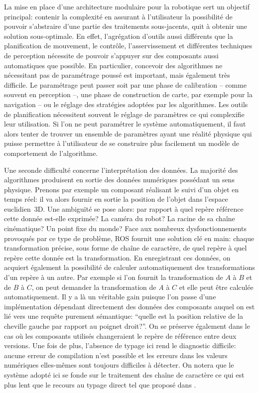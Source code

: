 La mise en place d'une architecture modulaire pour la robotique sert
un objectif principal: contenir la complexité en assurant à
l'utilisateur la possibilité de pouvoir s'abstraire d'une partie des
traitements sous-jacents, quit à obtenir une solution
sous-optimale. En effet, l'agrégation d'outils aussi différents que la
planification de mouvement, le contrôle, l'asservissement et
différentes techniques de perception nécessite de pouvoir s'appuyer
sur des composants aussi automatiques que possible. En particulier,
concevoir des algorithmes ne nécessitant pas de paramétrage poussé est
important, mais également très difficile. Le paramétrage peut passer
soit par une phase de calibration -- comme souvent en perception --,
une phase de construction de carte, par exemple pour la navigation --
ou le réglage des stratégies adoptées par les algorithmes. Les outils
de planification nécessitent souvent le réglage de paramètres ce qui
complexifie leur utilisation. Si l'on ne peut paramétrer le système
automatiquement, il faut alors tenter de trouver un ensemble de
paramètres ayant une réalité physique qui puisse permettre à
l'utilisateur de se construire plus facilement un modèle de
comportement de l'algorithme.


Une seconde difficulté concerne l'interprétation des données. La
majorité des algorithmes produisent en sortie des données numériques
possédant un sens physique. Prenons par exemple un composant réalisant
le suivi d'un objet en temps réel: il va alors fournir en sortie la
position de l'objet dans l'espace euclidien 3D. Une ambiguïté se pose
alors: par rapport à quel repère référence cette donnée est-elle
exprimée? La caméra du robot? La racine de sa chaîne cinématique? Un
point fixe du monde? Face aux nombreux dysfonctionnements provoqués
par ce type de problème, ROS fournit une solution clé en
main: chaque transformation précise, sous forme de chaîne de
caractère, de quel repère à quel repère cette donnée est la
transformation. En enregistrant ces données, on acquiert également la
possibilité de calculer automatiquement des transformations d'un
repère à un autre. Par exemple si l'on fournit la transformation de
$A$ à $B$ et de $B$ à $C$, on peut demander la transformation de $A$ à
$C$ et elle peut être calculée automatiquement. Il y a là un véritable
gain puisque l'on passe d'une implémentation dépendant directement des
données des composants auquel on est lié vers une requête purement
sémantique: ``quelle est la position relative de la cheville gauche
par rapport au poignet droit?''. On se préserve également dans le cas
où les composants utilisés changeraient le repère de référence entre
deux versions. Une fois de plus, l'absence de typage ici rend le
diagnostic difficile: aucune erreur de compilation n'est possible et
les erreurs dans les valeurs numériques elles-mêmes sont toujours
difficiles à détecter. On notera que le système adopté ici se fonde
sur le traitement des chaîne de caractère ce qui est plus lent que le
recours au typage direct tel que proposé dans \cite{12delaet.ram}.


